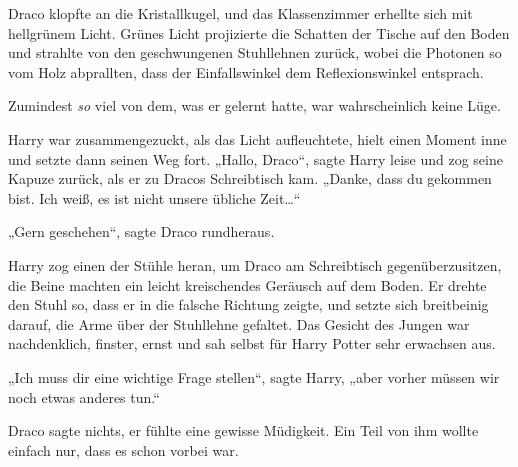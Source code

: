 Draco klopfte an die Kristallkugel, und das Klassenzimmer erhellte sich mit hellgrünem Licht. Grünes Licht projizierte die Schatten der Tische auf den Boden und strahlte von den geschwungenen Stuhllehnen zurück, wobei die Photonen so vom Holz abprallten, dass der Einfallswinkel dem Reflexionswinkel entsprach.

Zumindest \emph{so} viel von dem, was er gelernt hatte, war wahrscheinlich keine Lüge.

Harry war zusammengezuckt, als das Licht aufleuchtete, hielt einen Moment inne und setzte dann seinen Weg fort. „Hallo, Draco“, sagte Harry leise und zog seine Kapuze zurück, als er zu Dracos Schreibtisch kam. „Danke, dass du gekommen bist. Ich weiß, es ist nicht unsere übliche Zeit…“

„Gern geschehen“, sagte Draco rundheraus.

Harry zog einen der Stühle heran, um Draco am Schreibtisch gegenüberzusitzen, die Beine machten ein leicht kreischendes Geräusch auf dem Boden. Er drehte den Stuhl so, dass er in die falsche Richtung zeigte, und setzte sich breitbeinig darauf, die Arme über der Stuhllehne gefaltet. Das Gesicht des Jungen war nachdenklich, finster, ernst und sah selbst für Harry Potter sehr erwachsen aus.

„Ich muss dir eine wichtige Frage stellen“, sagte Harry, „aber vorher müssen wir noch etwas anderes tun.“

Draco sagte nichts, er fühlte eine gewisse Müdigkeit. Ein Teil von ihm wollte einfach nur, dass es schon vorbei war.

